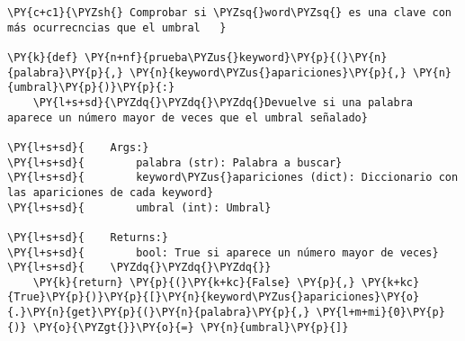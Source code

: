     \begin{tcolorbox}[breakable, size=fbox, boxrule=1pt, pad at break*=1mm,colback=cellbackground, colframe=cellborder]
\begin{Verbatim}[commandchars=\\\{\}]
\PY{c+c1}{\PYZsh{} Comprobar si \PYZsq{}word\PYZsq{} es una clave con más ocurrecncias que el umbral   }

\PY{k}{def} \PY{n+nf}{prueba\PYZus{}keyword}\PY{p}{(}\PY{n}{palabra}\PY{p}{,} \PY{n}{keyword\PYZus{}apariciones}\PY{p}{,} \PY{n}{umbral}\PY{p}{)}\PY{p}{:}
    \PY{l+s+sd}{\PYZdq{}\PYZdq{}\PYZdq{}Devuelve si una palabra aparece un número mayor de veces que el umbral señalado}

\PY{l+s+sd}{    Args:}
\PY{l+s+sd}{        palabra (str): Palabra a buscar}
\PY{l+s+sd}{        keyword\PYZus{}apariciones (dict): Diccionario con las apariciones de cada keyword}
\PY{l+s+sd}{        umbral (int): Umbral}

\PY{l+s+sd}{    Returns:}
\PY{l+s+sd}{        bool: True si aparece un número mayor de veces}
\PY{l+s+sd}{    \PYZdq{}\PYZdq{}\PYZdq{}}
    \PY{k}{return} \PY{p}{(}\PY{k+kc}{False} \PY{p}{,} \PY{k+kc}{True}\PY{p}{)}\PY{p}{[}\PY{n}{keyword\PYZus{}apariciones}\PY{o}{.}\PY{n}{get}\PY{p}{(}\PY{n}{palabra}\PY{p}{,} \PY{l+m+mi}{0}\PY{p}{)} \PY{o}{\PYZgt{}}\PY{o}{=} \PY{n}{umbral}\PY{p}{]} 
\end{Verbatim}
\end{tcolorbox}


